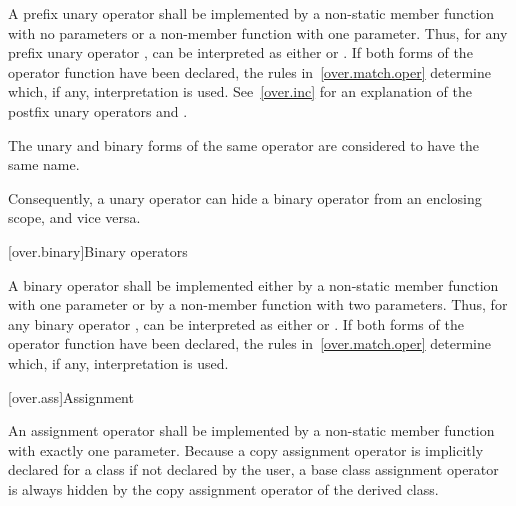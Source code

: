 \pnum
A prefix unary operator shall be implemented by a
non-static member function with no parameters or a
non-member function with one parameter.
%
Thus, for any prefix unary operator
,
can be interpreted as either
or
.
If both forms of the operator function have been declared,
the rules in~\ref{over.match.oper} determine which, if any, interpretation is
used.
See~\ref{over.inc} for an explanation of the postfix unary operators
\tcode{++}
and
\tcode{\dcr}.

\pnum
The unary and binary forms of the same operator are considered to have
the same name.
\begin{note}
Consequently, a unary operator can hide a binary
operator from an enclosing scope, and vice versa.
\end{note}

[over.binary]{Binary operators}%
%

\pnum
A binary operator shall be implemented either by a non-static member
function
with one parameter or by a non-member function with two parameters.
%
Thus, for any binary operator
,
can be interpreted as either
or
.
If both forms of the operator function have been declared,
the rules in~\ref{over.match.oper} determine which, if any, interpretation is
used.

[over.ass]{Assignment}
%

\pnum
An assignment operator shall be implemented by a
non-static member function with
exactly one parameter.
Because a copy assignment operator
is implicitly declared for a class
if not declared by the user,
a base class assignment operator is always hidden by the copy assignment
operator of the derived class.

